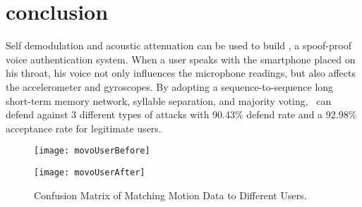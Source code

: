 \section{conclusion}

Self demodulation and acoustic attenuation can be used to build {\shortname}, a spoof-proof voice authentication system. When a user speaks with the smartphone placed on his throat, his voice not only influences the microphone readings, but also affects the accelerometer and gyroscopes. By adopting a sequence-to-sequence long short-term memory network, syllable separation, and majority voting, \shortname~can defend against 3 different types of attacks with 90.43\% defend rate and a 92.98\% acceptance rate for legitimate users.




\begin{landscape}
	\begin{figure}[h]
		\centering
		\begin{minipage}{.48\linewidth}
			\texttt{[image: movoUserBefore]}
			\label{fig:usermata}
			\vspace{.05in}
		\end{minipage}
		\begin{minipage}{.48\linewidth}
			\texttt{[image: movoUserAfter]}
			\label{fig:usermatb}
			\vspace{.05in}
		\end{minipage}
		\caption{Confusion Matrix of Matching Motion Data to Different Users.}
		\label{fig:usermat}
	\end{figure}
\end{landscape}